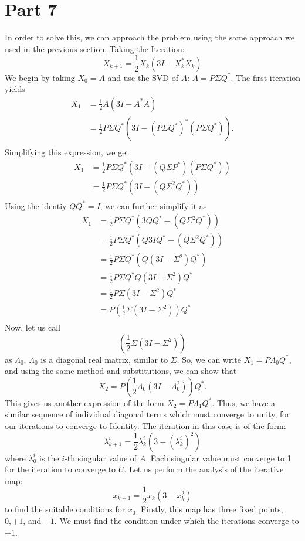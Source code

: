 \documentclass{article}
\begin{document}
\newpage
\section{Part 7}

In order to solve this, we can approach the problem using the same approach we used in the previous section. 
Taking the Iteration:
\[X_{k+1} = \frac{1}{2}X_k(3I - X_k^{*}X_k)\]
We begin by taking $X_0 = A$ and use the SVD of $A$: $A = P \Sigma Q^*$.
The first iteration yields
\begin{align*}
    X_{1} &= \frac{1}{2}A(3I - A^{*}A)\\
    &= \frac{1}{2} P \Sigma Q^*(3I - ( P \Sigma Q^*)^{*}( P \Sigma Q^*)).\\
\end{align*}
Simplifying this expression, we get:
\begin{align*}
    X_{1} &= \frac{1}{2} P \Sigma Q^*(3I - ( Q \Sigma P^*)( P \Sigma Q^*))\\
    &= \frac{1}{2} P \Sigma Q^*(3I - ( Q \Sigma^2 Q^*)).\\
\end{align*}
Using the identiy $Q Q^* = I$, we can further simplify it as
\begin{align*}
    X_{1} &= \frac{1}{2} P \Sigma Q^*(3Q Q^* - ( Q \Sigma^2 Q^*))\\
    &= \frac{1}{2} P \Sigma Q^*(Q 3I Q^* - ( Q \Sigma^2 Q^*))\\
    &= \frac{1}{2} P \Sigma Q^*(Q  (3I - \Sigma^2) Q^*)\\
    &= \frac{1}{2} P \Sigma Q^*Q  (3I - \Sigma^2) Q^*\\
    &= \frac{1}{2} P \Sigma (3I - \Sigma^2) Q^*\\
    &= P (\frac{1}{2} \Sigma (3I - \Sigma^2)) Q^*\\
\end{align*}
Now, let us call
\[(\frac{1}{2} \Sigma (3I - \Sigma^2))\] 
as $\Lambda_0$. $\Lambda_0$ is a diagonal real matrix, similar to $\Sigma$.
So, we can write $X_1 = P \Lambda_0 Q^*$, and using the same method and substitutions, we can show that 
\[X_{2} = P (\frac{1}{2} \Lambda_0 (3I - \Lambda_0^2)) Q^*.\]
This gives us another expression of the form $X_2 = P \Lambda_1 Q^*$.
Thus, we have a similar sequence of individual diagonal terms which must converge to unity, for our iterations to converge to Identity. The iteration in this case is of the form:
\[\lambda^{i}_{k+1} = \frac{1}{2}\lambda^{i}_k(3 - (\lambda^{i}_k)^2)\]
where $\lambda^{i}_0$ is the $i$-th singular value of $A$. Each singular value must converge to 1 for the iteration to converge to $U$. Let us perform the analysis of the iterative map:
\[x_{k+1} = \frac{1}{2}x_k(3 - x_{k}^2)\]
to find the suitable conditions for $x_0$. Firstly, this map has three fixed points, $0, +1$, and $-1$. We must find the condition under which the iterations converge to $+1$.
\newpage
\end{document}
